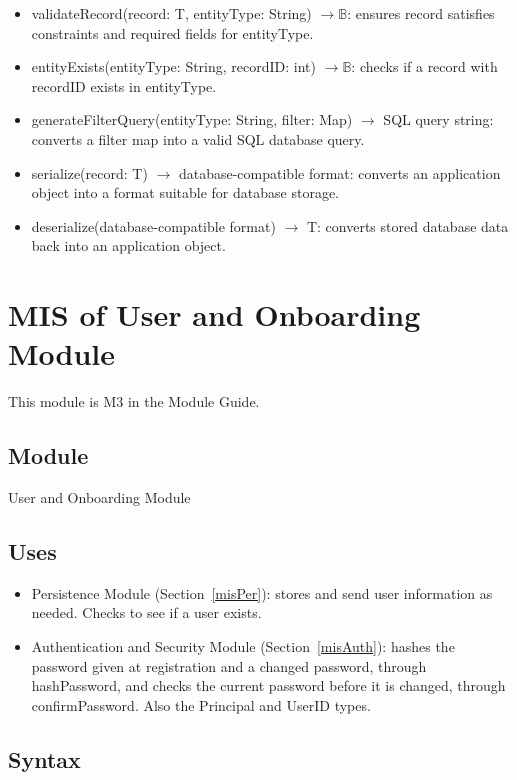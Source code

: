 \documentclass[12pt, titlepage]{article}
\begin{document}
\begin{itemize}
  \item validateRecord(record: T, entityType: String) $\rightarrow \mathbb{B}$: ensures record satisfies constraints and required fields for entityType.
  \item entityExists(entityType: String, recordID: int) $\rightarrow \mathbb{B}$: checks if a record with recordID exists in entityType.
  \item generateFilterQuery(entityType: String, filter: Map) $\rightarrow$ SQL query string: converts a filter map into a valid SQL database query.
  \item serialize(record: T) $\rightarrow$ database-compatible format: converts an application object into a format suitable for database storage.
  \item deserialize(database-compatible format) $\rightarrow$ T: converts stored database data back into an application object.
\end{itemize}

\section{MIS of User and Onboarding Module} \label{misUser}

This module is M3 in the Module Guide.
\subsection{Module}
User and Onboarding Module

\subsection{Uses}
\begin{itemize}
    \item Persistence Module (Section~\ref{misPer}): stores and send user information as needed. Checks to see if a user exists.
    \item Authentication and Security Module (Section~\ref{misAuth}): hashes
      the password given at registration and a changed password, through
      hashPassword, and checks the current password before it is changed,
      through confirmPassword. Also the Principal and UserID types.
\end{itemize}

\subsection{Syntax}
\end{document}
